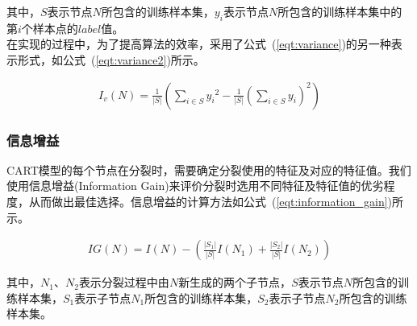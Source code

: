 \documentclass[a4paper,11pt,         %
               ]{article}
\begin{document}
其中，$S$表示节点$N$所包含的训练样本集，$y_{i}$表示节点$N$所包含的训练样本集中的第$i$个样本点的$label$值。 \\

在实现的过程中，为了提高算法的效率，采用了公式~(\ref{eqt:variance})的另一种表示形式，如公式~(\ref{eqt:variance2})所示。

\begin{eqnarray}
  \label{eqt:variance2}
{I}_{v}(N)=\frac{1}{\left | S \right |}\left ( \sum_{i\in S} {y_{i}}^2 - \frac{1}{\left | S \right |} \left ( \sum_{i \in S} {y_{i}} \right )^2 \right )
\end{eqnarray}


\subsubsection{信息增益}


CART模型的每个节点在分裂时，需要确定分裂使用的特征及对应的特征值。我们使用信息增益(Information Gain)来评价分裂时选用不同特征及特征值的优劣程度，从而做出最佳选择。信息增益的计算方法如公式~(\ref{eqt:information_gain})所示。

\begin{eqnarray}
  \label{eqt:information_gain}
IG(N) = I(N) - \left ( \frac{\left | S_{1}\right |}{\left | S \right |} I\left ( N_{1} \right ) + \frac{\left | S_{2}\right |}{\left | S \right |} I\left ( N_{2} \right )\right)
\end{eqnarray}

其中，$N_{1}$、$N_{2}$表示分裂过程中由$N$新生成的两个子节点，$S$表示节点$N$所包含的训练样本集，$S_{1}$表示子节点$N_{1}$所包含的训练样本集，$S_{2}$表示子节点$N_{2}$所包含的训练样本集。




\end{document}
